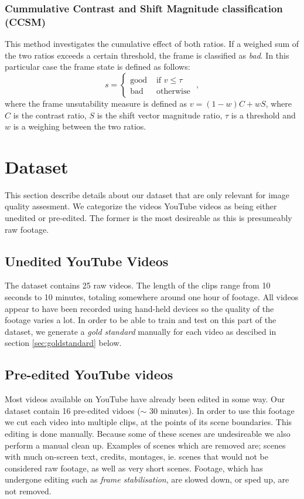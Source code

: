\subsubsection{Cummulative Contrast and Shift Magnitude classification (CCSM)}
%
This method investigates the cumulative effect of both ratios. If a weighed sum of the two ratios exceeds a certain threshold, the frame is classified as \textit{bad}. In this particular case the frame state is defined as follows:\\
%
\[
s = 
\begin{cases}
\text{good} & \text{ if } v \leq \tau\\
\text{bad} & \text{ otherwise }
\end{cases},
\]
%
where the frame unsutability measure is defined as $v=(1-w) C + w S$, where $C$ is the contrast ratio, $S$ is the shift vector magnitude ratio, $\tau$ is a threshold and $w$ is a weighing between the two ratios.
%
\section{Dataset}
%
This section describe details about our dataset that are only relevant for image quality assesment. We categorize the videos YouTube videos as being either unedited or pre-edited. The former is the most desireable as this is presumeably raw footage.
%
\subsection{Unedited YouTube Videos}
%
The dataset contains 25 raw videos. The length of the clips range from 10 seconds to 10 minutes, totaling somewhere around one hour of footage. All videos appear to have been recorded using hand-held devices so the quality of the footage varies a lot. In order to be able to train and test on this part of the dataset, we generate a \textit{gold standard} manually for each video as descibed in section \ref{sec:goldstandard} below.
%
\subsection{Pre-edited YouTube videos}\label{ph1:preeditedyoutube}
%
Most videos available on YouTube have already been edited in some way. Our dataset contain 16 pre-edited vidoes ($\sim$ 30 minutes). In order to use this footage we cut each video into multiple clips, at the points of its scene boundaries. This editing is done manually. Because some of these scenes are undesireable we also perform a manual clean up. Examples of scenes which are removed are; scenes with much on-screen text, credits, montages, ie. scenes that would not be considered raw footage, as well as very short scenes. Footage, which has undergone editing such as \textit{frame stabilisation}, are slowed down, or sped up, are not removed.
%
